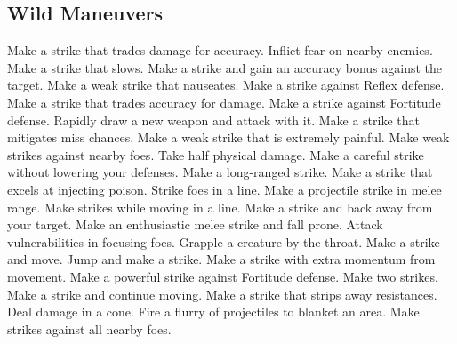 \subsection{Wild Maneuvers}\label{Wild Maneuvers}
\begin{spelllist}
 Make a strike that trades damage for accuracy.
 Inflict fear on nearby enemies.
 Make a strike that slows.
 Make a strike and gain an accuracy bonus against the target.
 Make a weak strike that nauseates.
 Make a strike against Reflex defense.
 Make a strike that trades accuracy for damage.
 Make a strike against Fortitude defense.
 Rapidly draw a new weapon and attack with it.
 Make a strike that mitigates miss chances.
 Make a weak strike that is extremely painful.
 Make weak strikes against nearby foes.
 Take half physical damage.
 Make a careful strike without lowering your defenses.
 Make a long-ranged strike.
 Make a strike that excels at injecting poison.
 Strike foes in a line.
 Make a projectile strike in melee range.
 Make strikes while moving in a line.
 Make a strike and back away from your target.
 Make an enthusiastic melee strike and fall prone.
 Attack vulnerabilities in focusing foes.
 Grapple a creature by the throat.
 Make a strike and move.
 Jump and make a strike.
 Make a strike with extra momentum from movement.
 Make a powerful strike against Fortitude defense.
 Make two strikes.
 Make a strike and continue moving.
 Make a strike that strips away resistances.
 Deal damage in a cone.
 Fire a flurry of projectiles to blanket an area.
 Make strikes against all nearby foes.

\end{spelllist}
